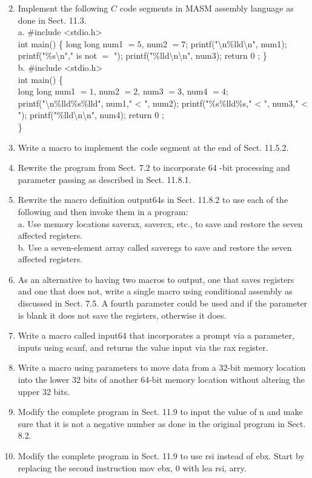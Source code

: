 \documentclass[10pt]{book}
\begin{document}
\begin{enumerate}
  \setcounter{enumi}{1}
  \item Implement the following $C$ code segments in MASM assembly language as done in Sect. 11.3.\\
a. \#include <stdio.h>\\
int main() \{ long long num1 $=5$, num2 $=7$; printf("\textbackslash n\%lld\textbackslash n", num1); printf("\%s\textbackslash n"," is not $=$ "); printf("\%lld\textbackslash n\textbackslash n", num3); return 0 ; \}\\
b. \#include <stdio.h>\\
int main() \{\\
long long num1 $=1$, num2 $=2$, num3 $=3$, num4 $=4$; printf("\textbackslash n\%lld\%s\%lld", num1," < ", num2); printf("\%s\%lld\%s," < ", num3," < "); printf("\%lld\textbackslash n\textbackslash n", num4); return 0 ;\\
\}
  \item Write a macro to implement the code segment at the end of Sect. 11.5.2.
  \item Rewrite the program from Sect. 7.2 to incorporate 64 -bit processing and parameter passing as described in Sect. 11.8.1.
  \item Rewrite the macro definition output64s in Sect. 11.8.2 to use each of the following and then invoke them in a program:\\
a. Use memory locations saverax, savercx, etc., to save and restore the seven affected registers.\\
b. Use a seven-element array called saveregs to save and restore the seven affected registers.
  \item As an alternative to having two macros to output, one that saves registers and one that does not, write a single macro using conditional assembly as discussed in Sect. 7.5. A fourth parameter could be used and if the parameter is blank it does not save the registers, otherwise it does.
  \item Write a macro called input64 that incorporates a prompt via a parameter, inputs using scanf, and returns the value input via the rax register.
  \item Write a macro using parameters to move data from a 32-bit memory location into the lower 32 bits of another 64-bit memory location without altering the upper 32 bits.
  \item Modify the complete program in Sect. 11.9 to input the value of n and make sure that it is not a negative number as done in the original program in Sect. 8.2.
  \item Modify the complete program in Sect. 11.9 to use rsi instead of ebx. Start by replacing the second instruction mov ebx, 0 with lea rsi, arry.
\end{enumerate}
\end{document}
